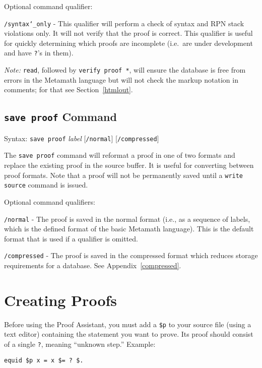 Optional command qualifier:

    \texttt{/syntax{\char`\_}only} - This qualifier will perform a check of syntax
        and RPN
        stack violations only.  It will not verify that the proof is
        correct.  This qualifier is useful for quickly determining which
        proofs are incomplete (i.e.\ are under development and have \texttt{?}'s
        in them).

{\em Note:} \texttt{read}, followed by \texttt{verify proof *}, will ensure
 the database is free
from errors in the Metamath language but will not check the markup notation
in comments; for that
see Section~\ref{htmlout}.

\subsection{\texttt{save proof} Command}
Syntax:  \texttt{save proof} {\em label} [\texttt{/normal}]
   [\texttt{/compressed}]

The \texttt{save proof} command will reformat a proof in one of two formats and
replace the existing proof in the source buffer.  It is useful for
converting between proof formats.  Note that a proof will not be
permanently saved until a \texttt{write source} command is issued.

Optional command qualifiers:

    \texttt{/normal} - The proof is saved in the normal format (i.e., as a
        sequence
        of labels, which is the defined format of the basic Metamath
        language).  This is the default format that
        is used if a qualifier
        is omitted.

    \texttt{/compressed} - The proof is saved in the compressed format which
        reduces storage requirements for a database.
        See Appendix~\ref{compressed}.




\section{Creating Proofs}\label{pfcommands}

Before using the Proof Assistant, you must add a \texttt{\$p} to your
source file (using a text editor) containing the statement you want to
prove.  Its proof should consist of a single \texttt{?}, meaning
``unknown step.''  Example:
\begin{verbatim}
equid $p x = x $= ? $.
\end{verbatim}

